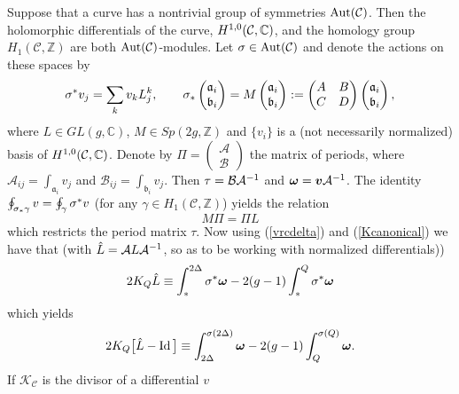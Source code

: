 \documentclass[pdftex]{sigma}
\numberwithin{equation}{section}
\def\Aut{\mathop{\rm Aut}\nolimits}
\def\id{\mathop{\rm Id}\nolimits}
\begin{document}
Suppose that a curve has a nontrivial group of symmetries
$\Aut(\mathcal{C})$. Then the holomorphic dif\/ferentials of the curve,
$H\sp{1,0}(\mathcal{C},\mathbb{C})$, and
 the homology group $H_1(\mathcal{C},\mathbb{Z})$  are both
$\Aut(\mathcal{C})$-modules. Let $\sigma\in\Aut(\mathcal{C})$ and
denote the actions on these spaces by
\begin{equation*}
\sigma\sp\ast v_j= \sum_k v_k {L}\sp{k}_j,\qquad
\sigma_\ast\begin{pmatrix}\mathfrak{a}_i\\
  \mathfrak{b}_i\end{pmatrix}=M\begin{pmatrix}\mathfrak{a}_i\\
  \mathfrak{b}_i\end{pmatrix}:=
  \begin{pmatrix}{A}&B\\
    C&D\end{pmatrix}\begin{pmatrix}\mathfrak{a}_i\\
    \mathfrak{b}_i
  \end{pmatrix},
\end{equation*}
where ${L}\in GL(g,\mathbb{C})$, $M\in Sp(2g,\mathbb{Z})$ and $\{v_i\}$
is a (not necessarily normalized) basis of $H\sp{1,0}(\mathcal{C},\mathbb{C})$. Denote by $\Pi=\begin{pmatrix}\mathcal{A}\\
\mathcal{B}\end{pmatrix}$ the matrix of periods, where
$\mathcal{A}_{ij}=\int_{\mathfrak{a}_i}v_j$ and
$\mathcal{B}_{ij}=\int_{\mathfrak{b}_i}v_j$. Then
$\tau=\mathcal{B}\mathcal{A}\sp{-1}$ and $\boldsymbol{\omega}=
\boldsymbol{v}\mathcal{A}\sp{-1}$. The identity
$\oint_{\sigma_\ast\gamma}v=\oint_\gamma\sigma\sp\ast v$ (for any $\gamma\in H_1(\mathcal{C},\mathbb{Z})$)
 yields
the relation
\begin{equation}
\label{gensym}
M\Pi=\Pi {L}
\end{equation}
which restricts the period matrix $\tau$. Now using (\ref{vrcdelta})
and (\ref{Kcanonical}) we have that (with $\hat{L}=\mathcal{A} {L}\mathcal{A}\sp{-1}$, so as to
be working with normalized dif\/ferentials))
\[
2K_Q \hat{L}\equiv\int_\ast\sp{2\Delta}\sigma\sp\ast{\boldsymbol{\omega}}
-2(g-1)\int_\ast\sp{Q}\sigma\sp\ast{\boldsymbol{\omega}}
\] which yields
\[
2K_Q\big[\hat{L}-\id\big]\equiv\int_{2\Delta}\sp{\sigma(2\Delta)}{\boldsymbol{\omega}}-
2(g-1)\int_Q\sp{\sigma(Q)}{\boldsymbol{\omega}} .
\] If
$\mathcal{K}_\mathcal{C}$ is the divisor of a dif\/ferential $v$
\end{document}

